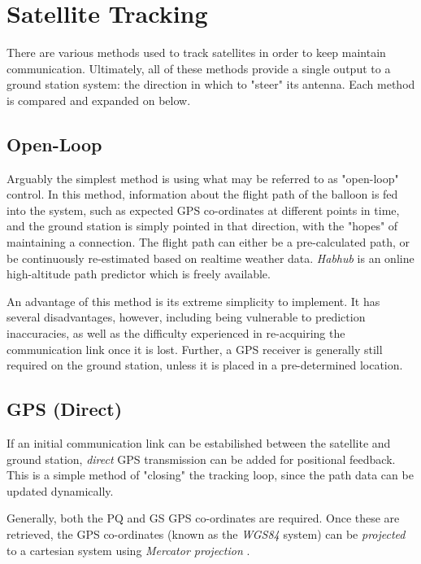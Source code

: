\graphicspath{{./figures/}}

\section{Satellite Tracking}
There are various methods used to track satellites in order to keep maintain communication. Ultimately, all of these methods provide a single output to a ground station system: the direction in which to "steer" its antenna. Each method is compared and expanded on below.

\subsection{Open-Loop}
Arguably the simplest method is using what may be referred to as "open-loop" control. In this method, information about the flight path of the balloon is fed into the system, such as expected GPS co-ordinates at different points in time, and the ground station is simply pointed in that direction, with the "hopes" of maintaining a connection. The flight path can either be a pre-calculated path, or be continuously re-estimated based on realtime weather data. \textit{Habhub} is an online high-altitude path predictor \cite{site-stratoballooningPredictionTracking} which is freely available.

An advantage of this method is its extreme simplicity to implement. It has several disadvantages, however, including being vulnerable to prediction inaccuracies, as well as the difficulty experienced in re-acquiring the communication link once it is lost. Further, a GPS receiver is generally still required on the ground station, unless it is placed in a pre-determined location.

\subsection{GPS (Direct)}
If an initial communication link can be estabilished between the satellite and ground station, \textit{direct} GPS transmission can be added for positional feedback. This is a simple method of "closing" the tracking loop, since the path data can be updated dynamically.

Generally, both the PQ and GS GPS co-ordinates are required. Once these are retrieved, the GPS co-ordinates (known as the \textit{WGS84} system) can be \textit{projected} to a cartesian system using \textit{Mercator projection} \cite{site-mercator}.

